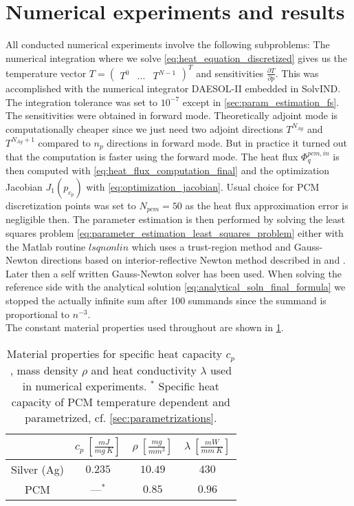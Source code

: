 \documentclass{scrartcl}[12pt, halfparskip]
\numberwithin{equation}{section}
\numberwithin{figure}{section}
\numberwithin{table}{section}
\begin{document}
\section{Numerical experiments and results}
\label{sec:numerical_experiments}
All conducted numerical experiments involve the following subproblems: The numerical integration where we solve \cref{eq:heat_equation_discretized} gives us the temperature vector $T = \begin{pmatrix} T^0 & ... & T^{N-1}  \end{pmatrix}^T$ and sensitivities $\frac{\partial T}{\partial p}$. This was accomplished with the numerical integrator DAESOL-II embedded in SolvIND. The integration tolerance was set to $10^{-7}$ except in \cref{sec:param_estimation_fs}.
The sensitivities were obtained in forward mode. Theoretically adjoint mode is computationally cheaper since we just need two adjoint directions $T^{N_{Ag}}$ and $T^{N_{Ag}+1}$ compared to $n_p$ directions in forward mode. But in practice it turned out that the computation is faster using the forward mode.
The heat flux $\varPhi_q^{pcm,in}$ is then computed with \cref{eq:heat_flux_computation_final} and the optimization Jacobian $J_1(p_{c_p})$ with \cref{eq:optimization_jacobian}. Usual choice for PCM discretization points was set to $N_{pcm}=50$ as the heat flux approximation error is negligible then. The parameter estimation is then performed by solving the least squares problem \cref{eq:parameter_estimation_least_squares_problem} either with the Matlab routine $lsqnonlin$ which uses a trust-region method and Gauss-Newton directions based on interior-reflective Newton method described in \cite{lsqnonlin_alg1} and \cite{lsqnonlin_alg2}. Later then a self written Gauss-Newton solver has been used.
When solving the reference side with the analytical solution \cref{eq:analytical_soln_final_formula} we stopped the actually infinite sum after 100 summands since the summand is proportional to $n^{-3}$. \\

The constant material properties used throughout are shown in \cref{tab:const_material_properties}.

\begin{table}[H]
	\centering
	\begin{tabular}{| c | c | c | c |} \hline
		& $c_p \ [\frac{mJ}{mg \ K}]$ & $\rho \ [\frac{mg}{mm^3}]$ & $\lambda \ [\frac{mW}{mm \ K}]$ \\ \hline
		Silver (Ag) & $0.235$ & $10.49$ & $430$ \\
		PCM & ---$^*$ & $0.85$ & $0.96$ \\ \hline
	\end{tabular}
	\caption{Material properties for specific heat capacity $c_p$, mass density $\rho$ and heat conductivity $\lambda$ used in numerical experiments. $^*$ Specific heat capacity of PCM temperature dependent and parametrized, cf. \cref{sec:parametrizations}.}
	\label{tab:const_material_properties}
\end{table}
\end{document}
